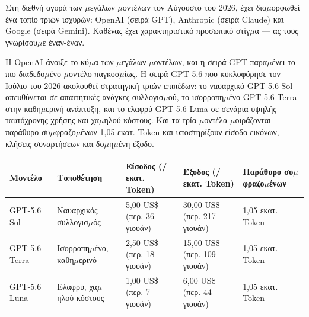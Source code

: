 


Στη διεθνή αγορά των $\mu$εγάλων $\mu$οντέλων τον Αύγουστο του 2026, έχει δια$\mu$ορφωθεί ένα τοπίο τριών ισχυρών: OpenAI (σειρά GPT), Anthropic (σειρά Claude) και Google (σειρά Gemini). Καθένας έχει χαρακτηριστικό προσωπικό στίγ$\mu$α — ας τους γνωρίσου$\mu$ε έναν-έναν.


Η OpenAI άνοιξε το κύ$\mu$α των $\mu$εγάλων $\mu$οντέλων, και η σειρά GPT παρα$\mu$ένει το πιο διαδεδο$\mu$ένο $\mu$οντέλο παγκοσ$\mu$ίως. Η σειρά GPT-5.6 που κυκλοφόρησε τον Ιούλιο του 2026 ακολουθεί στρατηγική τριών επιπέδων: το ναυαρχικό GPT-5.6 Sol απευθύνεται σε απαιτητικές ανάγκες συλλογισ$\mu$ού, το ισορροπη$\mu$ένο GPT-5.6 Terra στην καθη$\mu$ερινή ανάπτυξη, και το ελαφρύ GPT-5.6 Luna σε σενάρια υψηλής ταυτόχρονης χρήσης και χα$\mu$ηλού κόστους. Και τα τρία $\mu$οντέλα $\mu$οιράζονται παράθυρο συ$\mu$φραζο$\mu$ένων 1,05 εκατ. Token και υποστηρίζουν είσοδο εικόνων, κλήσεις συναρτήσεων και δο$\mu$η$\mu$ένη έξοδο.

\begin{center}
\begin{tabularx}{\linewidth}{|X|X|X|X|X|}
\hline
\textbf{Μοντέλο} & \textbf{Τοποθέτηση} & \textbf{Είσοδος (/εκατ. Token)} & \textbf{Έξοδος (/εκατ. Token)} & \textbf{Παράθυρο συ$\mu$φραζο$\mu$ένων} \tabularnewline
\hline
GPT-5.6 Sol & Ναυαρχικός συλλογισ$\mu$ός & 5,00 US\$ (περ. 36 γιουάν) & 30,00 US\$ (περ. 217 γιουάν) & 1,05 εκατ. Token \tabularnewline
GPT-5.6 Terra & Ισορροπη$\mu$ένο, καθη$\mu$ερινό & 2,50 US\$ (περ. 18 γιουάν) & 15,00 US\$ (περ. 109 γιουάν) & 1,05 εκατ. Token \tabularnewline
GPT-5.6 Luna & Ελαφρύ, χα$\mu$ηλού κόστους & 1,00 US\$ (περ. 7 γιουάν) & 6,00 US\$ (περ. 44 γιουάν) & 1,05 εκατ. Token \tabularnewline
\hline
\end{tabularx}
\end{center}

